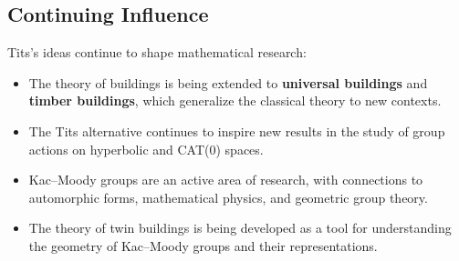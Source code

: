\subsection{Continuing Influence}

Tits's ideas continue to shape mathematical research:
\begin{itemize}
    \item The theory of buildings is being extended to \textbf{universal buildings} and \textbf{timber buildings}, which generalize the classical theory to new contexts.
    \item The Tits alternative continues to inspire new results in the study of group actions on hyperbolic and CAT(0) spaces.
    \item Kac--Moody groups are an active area of research, with connections to automorphic forms, mathematical physics, and geometric group theory.
    \item The theory of twin buildings is being developed as a tool for understanding the geometry of Kac--Moody groups and their representations.
\end{itemize}

